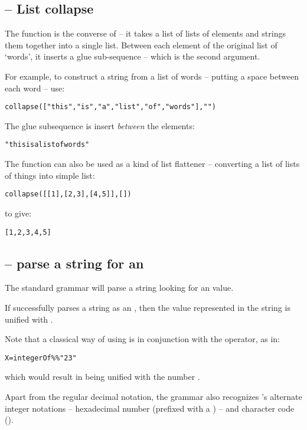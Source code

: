 \subsection{\texorpdfstring{ -- }{}List collapse}
\label{stdlib:collapse}

The  function is the converse of  -- it takes a list of lists of elements and strings them together into a single list. Between each element of the original list of `words', it inserts a glue sub-sequence -- which is the second argument.

For example, to construct a string from a list of words -- putting a space between each word -- use:
\begin{alltt}
collapse(["this", "is", "a", "list", "of", "words"]," ")
\end{alltt}
The glue subsequence is insert \emph{between} the elements:
\begin{alltt}
"this is a list of words"
\end{alltt}
The  function can also be used as a kind of list flattener -- converting a list of lists of things into simple list:
\begin{alltt}
collapse([[1],[2,3],[4,5]],[])
\end{alltt}
to give:
\begin{alltt}
[1,2,3,4,5]
\end{alltt}

\subsection{ -- parse a string for an }
\label{stdparse:integerOf}

The  standard grammar will parse a string looking for an  value.

If  successfully parses a string as an , then the value represented in the string is unified with .

Note that a classical way of using  is in conjunction with the \q{\%\%} operator, as in:
\begin{alltt}
X = integerOf\%\%"23"
\end{alltt}
which would result in  being unified with the number .

Apart from the regular decimal notation, the  grammar also recognizes \go's alternate integer notations -- hexadecimal number (prefixed with a ) -- and character code ().


